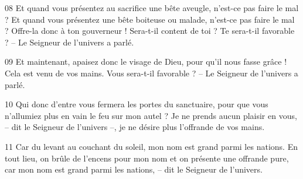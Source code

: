 
08 Et quand vous présentez au sacrifice une bête aveugle, n’est-ce pas faire le mal ? Et quand vous présentez une bête boiteuse ou malade, n’est-ce pas faire le mal ? Offre-la donc à ton gouverneur ! Sera-t-il content de toi ? Te sera-t-il favorable ? – Le Seigneur de l’univers a parlé.

09 Et maintenant, apaisez donc le visage de Dieu, pour qu’il nous fasse grâce ! Cela est venu de vos mains. Vous sera-t-il favorable ? – Le Seigneur de l’univers a parlé.

10 Qui donc d’entre vous fermera les portes du sanctuaire, pour que vous n’allumiez plus en vain le feu sur mon autel ? Je ne prends aucun plaisir en vous, – dit le Seigneur de l’univers –, je ne désire plus l’offrande de vos mains.

11 Car du levant au couchant du soleil, mon nom est grand parmi les nations. En tout lieu, on brûle de l’encens pour mon nom et on présente une offrande pure, car mon nom est grand parmi les nations, – dit le Seigneur de l’univers.